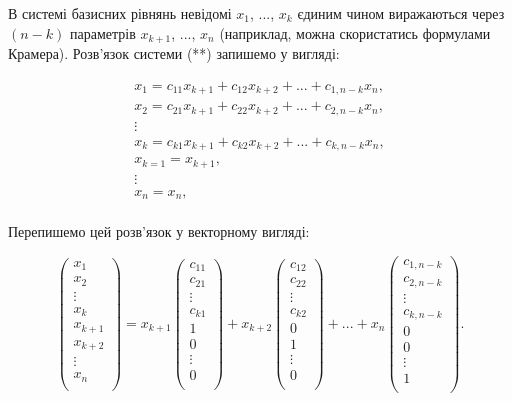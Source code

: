 В системі базисних рівнянь невідомі $x_1$, ..., $x_k$ єдиним чином виражаються
через $(n - k)$ параметрів $x_{k+1}$, ..., $x_n$ (наприклад, можна скористатись формулами
Крамера). Розв’язок системи (**) запишемо у вигляді:

$$\begin{matrix}
	x_1 = c_{11} x_{k+1} + c_{12} x_{k+2} + ... + c_{1,n-k} x_{n}, \\
	x_2 = c_{21} x_{k+1} + c_{22} x_{k+2} + ... + c_{2,n-k} x_{n}, \\
	\vdots \\
	x_k = c_{k1} x_{k+1} + c_{k2} x_{k+2} + ... + c_{k,n-k} x_{n}, \\
	x_{k=1} = x_{k+1}, \\
	\vdots \\
	x_{n} = x_{n}, \\
\end{matrix} $$


Перепишемо цей розв’язок у векторному вигляді:

$$\begin{pmatrix}
	x_1 \\
	x_2 \\
	\vdots \\
	x_k \\
	x_{k+1} \\
	x_{k+2} \\
	\vdots \\
	x_n \\
\end{pmatrix} = x_{k+1} \begin{pmatrix}
	c_{11} \\
	c_{21} \\
	\vdots \\
	c_{k1} \\
	1 \\
	0 \\
	\vdots \\
	0 \\
\end{pmatrix} + x_{k+2} \begin{pmatrix}
	c_{12} \\
	c_{22} \\
	\vdots \\
	c_{k2} \\
	0 \\
	1 \\
	\vdots \\
	0 \\
\end{pmatrix} + ... + x_{n} \begin{pmatrix}
	c_{1,n-k} \\
	c_{2,n-k} \\
	\vdots \\
	c_{k,n-k} \\
	0 \\
	0 \\
	\vdots \\
	1 \\
\end{pmatrix}.$$

